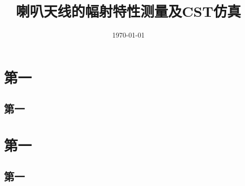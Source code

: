 \documentclass{../source/Experiment}
\title{喇叭天线的幅射特性测量及CST仿真}
\date{\today}
\begin{document}
    \section{第一}
        \subsection{第一}

    \setcounter{section}{0}
    
    \section{第一}
        \subsection{第一}
\end{document}
